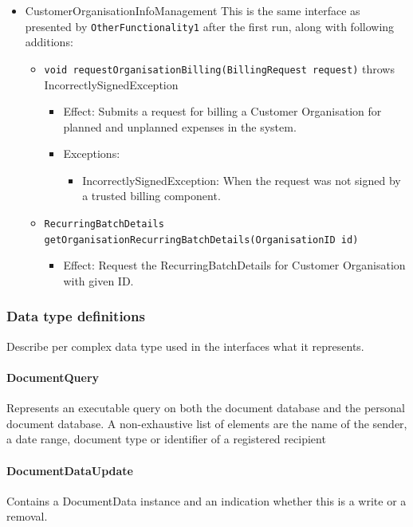 \documentclass[a4paper,10pt]{article}
\begin{document}
\begin{itemize}
    \item CustomerOrganisationInfoManagement
    This is the same interface as presented by \texttt{OtherFunctionality1} after the first run, along with following additions:
    \begin{itemize}
        \item \texttt{void requestOrganisationBilling(BillingRequest request)} throws IncorrectlySignedException
        \begin{itemize}
            \item Effect: Submits a request for billing a Customer Organisation for planned and unplanned expenses in the system.
            \item Exceptions:
            \begin{itemize}
                \item IncorrectlySignedException: When the request was not signed by a trusted billing component.
            \end{itemize}
        \end{itemize}

        \item \texttt{RecurringBatchDetails getOrganisationRecurringBatchDetails(OrganisationID id)}
        \begin{itemize}
            \item Effect: Request the RecurringBatchDetails for Customer Organisation with given ID.
        \end{itemize}
    \end{itemize}
\end{itemize}

\subsubsection{Data type definitions}
Describe per complex data type used in the interfaces what it represents.

\paragraph{DocumentQuery} Represents an executable query on both the document database and the personal document database. A non-exhaustive list of elements are the name of the sender, a date range, document type or identifier of a registered recipient

\paragraph{DocumentDataUpdate} Contains a DocumentData instance and an indication whether this is a write or a removal.
\end{document}
